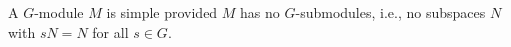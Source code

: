 A $G$-module $M$ is simple provided $M$ has no $G$-submodules, i.e., no subspaces $N$ with $sN = N$ for all $s \in G$.
